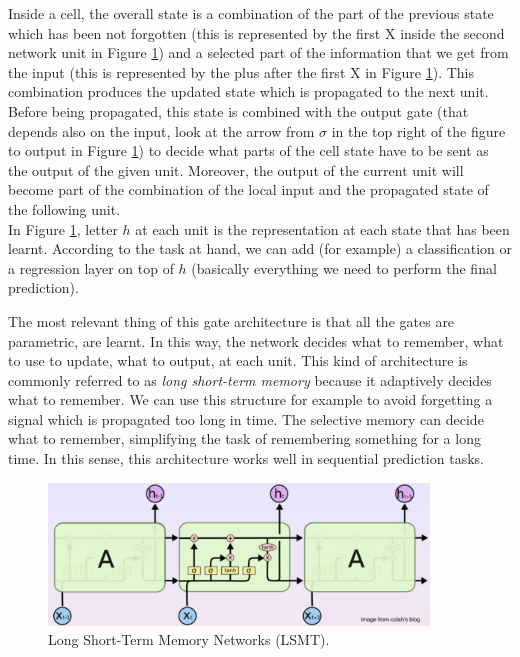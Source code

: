 Inside a cell, the overall state is a combination of the part of the previous state
which has been not forgotten (this is represented by the first X inside the
second network unit in Figure \ref{fig:lsmt}) and a selected part of the information
that we get from the input (this is represented by the plus after the first X in
Figure \ref{fig:lsmt}). This combination produces the updated state which is
propagated to the next unit. Before being propagated, this state is combined
with the output gate (that depends also on the input, look at the arrow from
$\sigma$ in the top right of the figure to output in Figure \ref{fig:lsmt}) to decide
what parts of the cell state have to be sent as the output of the given unit.
Moreover, the output of the current unit will become part of the combination of the
local input and the propagated state of the following unit. \\ In Figure
\ref{fig:lsmt}, letter $h$ at each unit is the representation at each state that
has been learnt. According to the task at hand, we can add (for example) a classification
or a regression layer on top of $h$ (basically everything we need to perform the
final prediction).
\newline

The most relevant thing of this gate architecture is that all the gates are parametric,
are learnt. In this way, the network decides what to remember, what to use to update,
what to output, at each unit. This kind of architecture is commonly referred to
as \textit{long short-term memory} because it adaptively decides what to remember.
We can use this structure for example to avoid forgetting a signal which is
propagated too long in time. The selective memory can decide what to remember,
simplifying the task of remembering something for a long time. In this sense,
this architecture works well in sequential prediction tasks.

\begin{figure}[H]
	\centering
	\includegraphics[width=0.9\textwidth]{
		images/16_DeepLearning_longShortTermMemoryNetworks.png
	}
	\caption{Long Short-Term Memory Networks (LSMT).}
	\label{fig:lsmt}
\end{figure}

